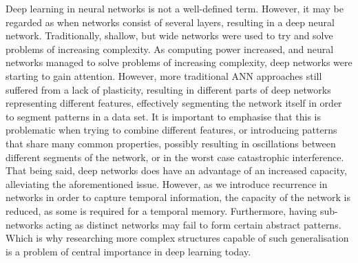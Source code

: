 
Deep learning in neural networks is not a well-defined term. However, it may be regarded as when networks consist of several layers, resulting in a deep neural network.
Traditionally, shallow, but wide networks were used to try and solve problems of increasing complexity.
As computing power increased, and neural networks managed to solve problems of increasing complexity, deep networks were starting to gain attention. However, more traditional ANN approaches still suffered from a lack of plasticity, resulting in different parts of deep networks representing different features, effectively segmenting the network itself in order to segment patterns in a data set. It is important to emphasise that this is problematic when trying to combine different features, or introducing patterns that share many common properties, possibly resulting in oscillations between different segments of the network, or in the worst case catastrophic interference.
That being said, deep networks does have an advantage of an increased capacity, alleviating the aforementioned issue. However, as we introduce recurrence in networks in order to capture temporal information, the capacity of the network is reduced, as some is required for a temporal memory. Furthermore, having sub-networks acting as distinct networks may fail to form certain abstract patterns. Which is why researching more complex structures capable of such generalisation is a problem of central importance in deep learning today.
\\

